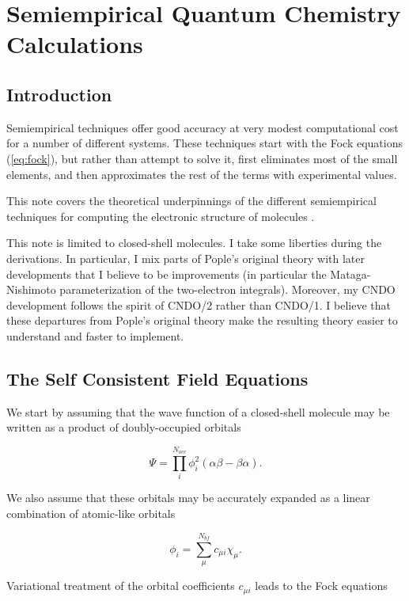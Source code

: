 \chapter{Semiempirical Quantum Chemistry Calculations}

\section{Introduction}
Semiempirical techniques offer good accuracy at very modest
computational cost for a number of different systems. These techniques
start with the Fock equations (\ref{eq:fock}), but rather than attempt
to solve it, first eliminates most of the small elements, and then
approximates the rest of the terms with experimental values. 

This note covers the theoretical underpinnings of the different
semiempirical techniques for computing
the electronic structure of molecules \cite{Pople65, Pople65a,
Pople66, Pople70}.

This note is limited to closed-shell molecules. I take some liberties
during the derivations. In particular, I mix parts of Pople's original
theory with later developments that I believe to be improvements (in
particular the Mataga-Nishimoto parameterization of the two-electron
integrals). Moreover, my CNDO development follows the spirit of CNDO/2
rather than CNDO/1. I believe that these departures from Pople's
original theory make the resulting theory easier to understand and
faster to implement.

\section{The Self Consistent Field Equations}
We start by assuming that the wave function of a closed-shell molecule
may be written as a product of doubly-occupied orbitals

\begin{equation}
	\Psi = \prod_i^{N_{occ}}\phi_i^2(\alpha\beta-\beta\alpha).
\end{equation}

\noindent We also assume that these orbitals may be accurately
expanded as a linear combination of atomic-like orbitals

\begin{equation}
	\phi_i = \sum_{\mu}^{N_{bf}} c_{\mu i}\chi_\mu.
\end{equation}

\noindent Variational treatment of the orbital coefficients $c_{\mu
i}$ leads to the Fock equations

